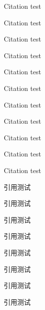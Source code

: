 \documentclass[degree=doctor]{thuthesis}
\begin{document}
\START
\showoutput

\mainmatter

Citation \cite{crane1972invisible} test\par
Citation \cite{baker1995future} test\par
Citation \cite{jha2004effect} test\par

Citation \citet{baker1995future} test\par
Citation \citet[42]{baker1995future} test\par
Citation \citep{baker1995future} test\par
Citation \citep[42]{baker1995future} test\par
Citation \citep[see][]{baker1995future} test\par
Citation \citep[see][42]{baker1995future} test\par
Citation \citet*{baker1995future} test\par
Citation \citep*{baker1995future} test\par

引用\citet{wangbing1997dianzi}测试\par
引用\citet[42]{wangbing1997dianzi}测试\par
引用\citep{wangbing1997dianzi}测试\par
引用\citep[42]{wangbing1997dianzi}测试\par
引用\citep[见][]{wangbing1997dianzi}测试\par
引用\citep[见][42]{wangbing1997dianzi}测试\par
引用\citet*{wangbing1997dianzi}测试\par
引用\citep*{wangbing1997dianzi}测试\par

\nocite{*}

\printbibliography

\clearpage
\OMIT
\end{document}
